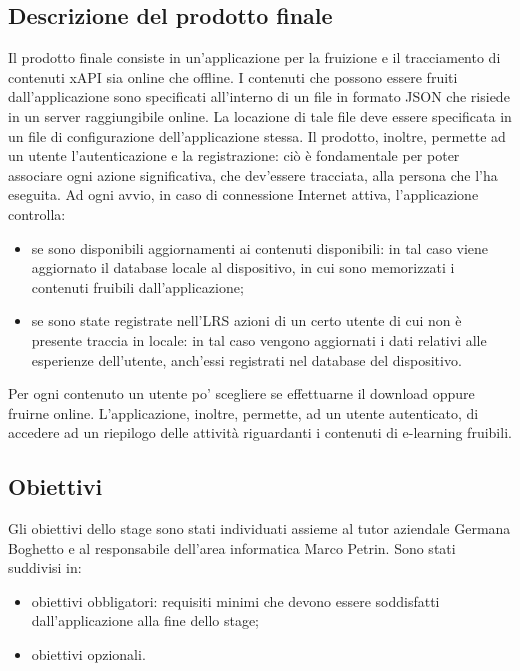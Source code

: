 \documentclass[../Tesi.tex]{subfiles}
\begin{document}
	\subsection{Descrizione del prodotto finale}
	Il prodotto finale consiste in un'applicazione per la fruizione e il tracciamento di contenuti xAPI sia online che offline. I contenuti che possono essere fruiti dall’applicazione sono specificati all'interno di un file in formato JSON che risiede in un server raggiungibile online. La locazione di tale file deve essere specificata in un file di configurazione dell'applicazione stessa. Il prodotto, inoltre, permette ad un utente l'autenticazione e la registrazione: ciò è fondamentale per poter associare ogni azione significativa, che dev'essere tracciata, alla persona che l'ha eseguita. Ad ogni avvio, in caso di connessione Internet attiva, l'applicazione controlla:
	\begin{itemize}
		\item se sono disponibili aggiornamenti ai contenuti disponibili: in tal caso viene aggiornato il database locale al dispositivo, in cui sono memorizzati i contenuti fruibili dall'applicazione;
		\item se sono state registrate nell'LRS azioni di un certo utente di cui non è presente traccia in locale: in tal caso vengono aggiornati i dati relativi alle esperienze dell'utente, anch'essi registrati nel database del dispositivo.
	\end{itemize} 
	Per ogni contenuto un utente po' scegliere se effettuarne il download oppure fruirne online.
	L'applicazione, inoltre, permette, ad un utente autenticato, di accedere ad un riepilogo delle attività riguardanti i contenuti di e-learning fruibili. 

	\subsection{Obiettivi}
		Gli obiettivi dello stage sono stati individuati assieme al tutor aziendale Germana Boghetto e al responsabile dell'area informatica Marco Petrin. Sono stati suddivisi in:
		\begin{itemize}
			\item obiettivi obbligatori: requisiti minimi che devono essere soddisfatti dall'applicazione alla fine dello stage;
			\item obiettivi opzionali.
		\end{itemize}
\end{document}
